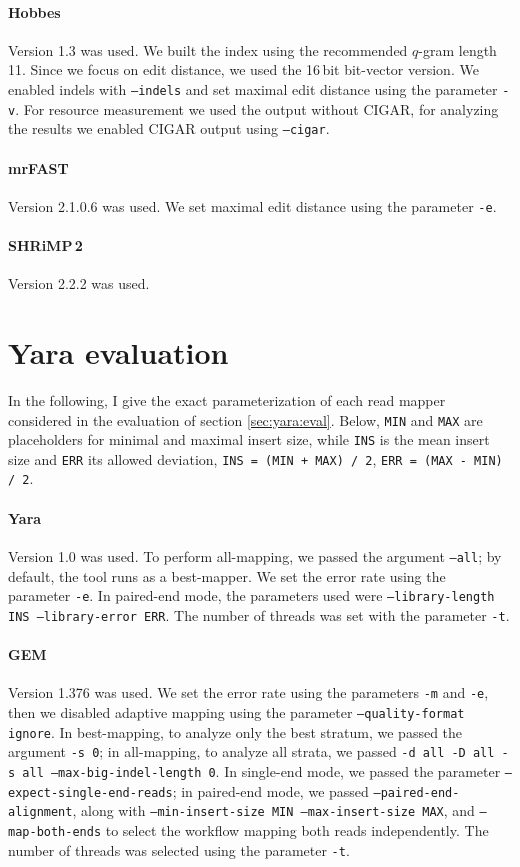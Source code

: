 \paragraph{Hobbes}
Version 1.3 was used.
We built the index using the recommended $q$-gram length 11.
Since we focus on edit distance, we used the 16\,bit bit-vector version.
We enabled indels with \texttt{--indels} and set maximal edit distance using the parameter \texttt{-v}.
For resource measurement we used the output without CIGAR, for analyzing the results we enabled CIGAR output using \texttt{--cigar}.

\paragraph{mrFAST}
Version 2.1.0.6 was used.
We set maximal edit distance using the parameter \texttt{-e}.

\paragraph{SHRiMP\,2}
Version 2.2.2 was used.


\section{Yara evaluation}
\label{sup:yara:param}

In the following, I give the exact parameterization of each read mapper considered in the evaluation of section \ref{sec:yara:eval}.
Below, \texttt{MIN} and \texttt{MAX} are placeholders for minimal and maximal insert size, while \texttt{INS} is the mean insert size and \texttt{ERR} its allowed deviation, \ie \texttt{INS = (MIN + MAX) / 2}, \texttt{ERR = (MAX - MIN) / 2}.

\paragraph{Yara}
Version 1.0 was used.
To perform all-mapping, we passed the argument \texttt{--all}; by default, the tool runs as a best-mapper.
We set the error rate using the parameter \texttt{-e}.
In paired-end mode, the parameters used were \texttt{--library-length INS --library-error ERR}.
The number of threads was set with the parameter \texttt{-t}.

\paragraph{GEM}
Version 1.376 was used.
We set the error rate using the parameters \texttt{-m} and \texttt{-e}, then we disabled adaptive mapping using the parameter \texttt{--quality-format ignore}.
In best-mapping, to analyze only the best stratum, we passed the argument \texttt{-s 0};
in all-mapping, to analyze all strata, we passed \texttt{-d all -D all -s all --max-big-indel-length 0}.
In single-end mode, we passed the parameter \texttt{--expect-single-end-reads}; in paired-end mode, we passed \texttt{--paired-end-alignment}, along with \texttt{--min-insert-size MIN --max-insert-size MAX}, and \texttt{--map-both-ends} to select the workflow mapping both reads independently.
The number of threads was selected using the parameter \texttt{-t}.

